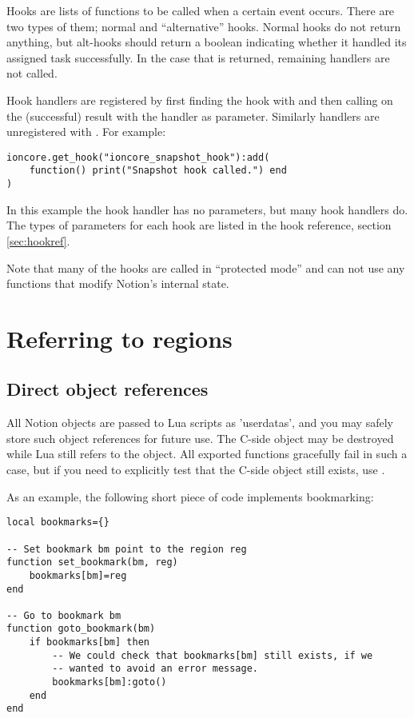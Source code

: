 Hooks are lists of functions to be called when a certain event occurs.
There are two types of them; normal and ``alternative'' hooks. Normal
hooks do not return anything, but alt-hooks should return a boolean
indicating whether it handled its assigned task successfully. In the case
that  is returned, remaining handlers are not called.

Hook handlers are registered by first finding the hook
with  and then calling 
on the (successful) result with the handler as parameter. Similarly
handlers are unregistered with . For example:

\begin{verbatim}
ioncore.get_hook("ioncore_snapshot_hook"):add(
    function() print("Snapshot hook called.") end
)
\end{verbatim}

In this example the hook handler has no parameters, but many hook
handlers do. The types of parameters for each hook are listed in
the hook reference, section \ref{sec:hookref}.

Note that many of the hooks are called in ``protected mode'' and can not 
use any functions that modify Notion's internal state. 


\section{Referring to regions}

\subsection{Direct object references}

All Notion objects are passed to Lua scripts as 'userdatas', and you may
safely store such object references for future use. The C-side object
may be destroyed while Lua still refers to the object. All exported
functions gracefully fail in such a case, but if you need to explicitly
test that the C-side object still exists, use .

As an example, the following short piece of code implements 
bookmarking:

\begin{verbatim}
local bookmarks={}

-- Set bookmark bm point to the region reg
function set_bookmark(bm, reg)
    bookmarks[bm]=reg
end

-- Go to bookmark bm
function goto_bookmark(bm)
    if bookmarks[bm] then
        -- We could check that bookmarks[bm] still exists, if we
        -- wanted to avoid an error message.
        bookmarks[bm]:goto()
    end
end
\end{verbatim}

